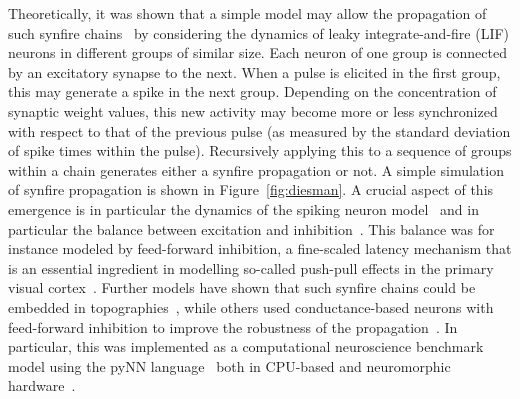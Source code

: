 \documentclass[brainsci, %
               review,submit,pdftex,moreauthors
               ]{Definitions/mdpi}
\begin{document}
Theoretically, it was shown that a simple model may allow the propagation of such synfire chains~\citep{gewaltig_propagation_2001} by considering the dynamics of leaky integrate-and-fire (LIF) neurons in different groups of similar size. Each neuron of one group is connected by an excitatory synapse to the next. When a pulse is elicited in the first group, this may generate a spike in the next group. Depending on the concentration of synaptic weight values, this new activity may become more or less synchronized with respect to that of the previous pulse (as measured by the standard deviation of spike times within the pulse). Recursively applying this to a sequence of groups within a chain generates either a synfire propagation or not. A simple simulation of synfire propagation is shown in Figure~\ref{fig:diesman}. A crucial aspect of this emergence is in particular the dynamics of the spiking neuron model~\citep{gerstner_time_1995} and in particular the balance between excitation and inhibition~\citep{azouz_stimulus-selective_2008}. This balance was for instance modeled by feed-forward inhibition, a fine-scaled latency mechanism that is an essential ingredient in modelling so-called push-pull effects in the primary visual cortex~\citep{kremkow_push-pull_2016}. Further models have shown that such synfire chains could be embedded in topographies~\citep{aviel_embedding_2003}, while others used conductance-based neurons with feed-forward inhibition to improve the robustness of the propagation~\citep{kremkow_functional_2010}. In particular, this was implemented as a computational neuroscience benchmark model using the pyNN language~\citep{davison_pynn_2008} both in CPU-based and neuromorphic hardware~\citep{pfeil_six_2013}. %
%
\end{document}
